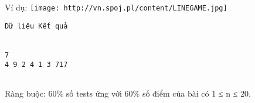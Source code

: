 Ví dụ:
\texttt{[image: http://vn.spoj.pl/content/LINEGAME.jpg]}
\begin{verbatim}
Dữ liệu Kết quả


7
4 9 2 4 1 3 717


\end{verbatim}

Ràng buộc: 60\% số tests ứng với 60\% số điểm của bài có 1 ≤ n ≤ 20.